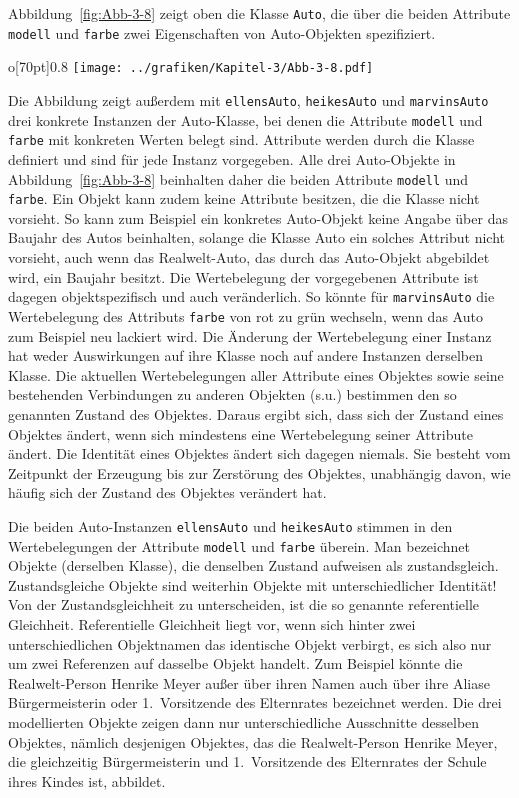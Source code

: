 Abbildung~\ref{fig:Abb-3-8} zeigt oben die Klasse \texttt{Auto}, die über die beiden Attribute \texttt{modell} und \texttt{farbe} zwei Eigenschaften von Auto-Objekten spezifiziert.
\begin{wrapfigure}{o}[70pt]{0.8\textwidth}
	\centering 
	\texttt{[image: ../grafiken/Kapitel-3/Abb-3-8.pdf]}
	\caption{Eine Klasse Auto und drei konkrete Instanzen der Klasse}
	\label{fig:Abb-3-8}
	\vspace{-6pt}
\end{wrapfigure}
Die Abbildung zeigt außerdem mit \texttt{ellensAuto}, \texttt{heikesAuto} und \texttt{marvinsAuto} drei konkrete Instanzen der Auto-Klasse, bei denen die Attribute \texttt{modell} und \texttt{farbe} mit konkreten Werten belegt sind. Attribute werden durch die Klasse definiert und sind für jede Instanz vorgegeben. Alle drei Auto-Objekte in Abbildung~\ref{fig:Abb-3-8} beinhalten daher die beiden Attribute \texttt{modell} und \texttt{farbe}. Ein Objekt kann zudem keine Attribute besitzen, die die Klasse nicht vorsieht. So kann zum Beispiel ein konkretes Auto-Objekt keine Angabe über das Baujahr des Autos beinhalten, solange die Klasse Auto ein solches Attribut nicht vorsieht, auch wenn das Realwelt-Auto, das durch das Auto-Objekt abgebildet wird, ein Baujahr besitzt. Die Wertebelegung der vorgegebenen Attribute ist dagegen objektspezifisch und auch veränderlich. So könnte für \texttt{marvinsAuto} die Wertebelegung des Attributs \texttt{farbe} von rot zu grün wechseln, wenn das Auto zum Beispiel neu lackiert wird. Die Änderung der Wertebelegung einer Instanz hat weder Auswirkungen auf ihre Klasse noch auf andere Instanzen derselben Klasse. Die aktuellen Wertebelegungen aller Attribute eines Objektes sowie seine bestehenden Verbindungen zu anderen Objekten (s.u.) bestimmen den so genannten Zustand des Objektes. Daraus ergibt sich, dass sich der Zustand eines Objektes ändert, wenn sich mindestens eine Wertebelegung seiner Attribute ändert. Die Identität eines Objektes ändert sich dagegen niemals. Sie besteht vom Zeitpunkt der Erzeugung bis zur Zerstörung des Objektes, unabhängig davon, wie häufig sich der Zustand des Objektes verändert hat.

Die beiden Auto-Instanzen \texttt{ellensAuto} und \texttt{heikesAuto} stimmen in den Wertebelegungen der Attribute \texttt{modell} und \texttt{farbe} überein. Man bezeichnet Objekte (derselben Klasse), die denselben Zustand aufweisen als zustandsgleich. Zustandsgleiche Objekte sind weiterhin Objekte mit unterschiedlicher Identität! Von der Zustandsgleichheit zu unterscheiden, ist die so genannte referentielle Gleichheit. Referentielle Gleichheit liegt vor, wenn sich hinter zwei unterschiedlichen Objektnamen das identische Objekt verbirgt, es sich also nur um zwei Referenzen auf dasselbe Objekt handelt. Zum Beispiel könnte die Realwelt-Person Henrike Meyer außer über ihren Namen auch über ihre Aliase Bürgermeisterin oder 1.~Vorsitzende des Elternrates bezeichnet werden. Die drei modellierten Objekte zeigen dann nur unterschiedliche Ausschnitte desselben Objektes, nämlich desjenigen Objektes, das die Realwelt-Person Henrike Meyer, die gleichzeitig Bürgermeisterin und 1.~Vorsitzende des Elternrates der Schule ihres Kindes ist, abbildet.

